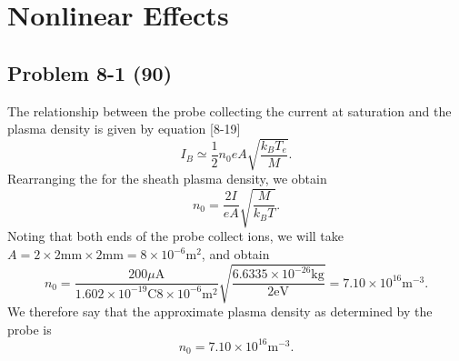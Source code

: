 \chapter{Nonlinear Effects}
\label{ch:Eight}

\section*{Problem 8-1 (90)}
\label{sec:8-1}
The relationship between the probe collecting the current at saturation and the plasma density is given by equation [8-19]
\begin{equation*}
	I_B \simeq \frac{1}{2}n_0eA\sqrt{\dfrac{k_BT_e}{M}}.
\end{equation*}
Rearranging the for the sheath plasma density, we obtain
\begin{equation*}
	n_0 = \dfrac{2I}{eA} \sqrt{\dfrac{M}{k_BT}}.
\end{equation*}
Noting that both ends of the probe collect ions, we will take \(A = 2 \times 2\text{mm}\times 2\text{mm} = 8 \times 10^{-6}\text{m}^2\), and obtain
\begin{equation*}
	n_0 = \dfrac{200\mu\text{A}}{1.602\times 10^{-19}\text{C}8 \times 10^{-6}\text{m}^2} \sqrt{\dfrac{6.6335\times 10^{-26}\text{kg}}{2\text{eV}}} = 7.10\times 10^{16}\text{m}^{-3}.
\end{equation*}
We therefore say that the approximate plasma density as determined by the probe is
\begin{equation*}
	n_0 = 7.10\times 10^{16}\text{m}^{-3}.
\end{equation*}

